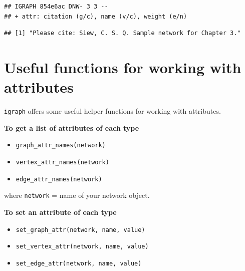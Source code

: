 \documentclass[
]{book}
\newenvironment{Shaded}{\begin{snugshade}}{\end{snugshade}}
\newcommand{\CommentTok}[1]{\textcolor[rgb]{0.56,0.35,0.01}{\textit{#1}}}
\newcommand{\FunctionTok}[1]{\textcolor[rgb]{0.13,0.29,0.53}{\textbf{#1}}}
\newcommand{\NormalTok}[1]{#1}
\newcommand{\OtherTok}[1]{\textcolor[rgb]{0.56,0.35,0.01}{#1}}
\newcommand{\SpecialCharTok}[1]{\textcolor[rgb]{0.81,0.36,0.00}{\textbf{#1}}}
\newcommand{\StringTok}[1]{\textcolor[rgb]{0.31,0.60,0.02}{#1}}
\providecommand{\tightlist}{%
  \setlength{\itemsep}{0pt}\setlength{\parskip}{0pt}}
\begin{document}
\begin{Shaded}
\end{Shaded}

\begin{verbatim}
## IGRAPH 854e6ac DNW- 3 3 -- 
## + attr: citation (g/c), name (v/c), weight (e/n)
\end{verbatim}

\begin{Shaded}
\end{Shaded}

\begin{verbatim}
## [1] "Please cite: Siew, C. S. Q. Sample network for Chapter 3."
\end{verbatim}

\section{Useful functions for working with attributes}\label{useful-functions-for-working-with-attributes}

\texttt{igraph} offers some useful helper functions for working with attributes.

\textbf{To get a list of attributes of each type}

\begin{itemize}
\tightlist
\item
  \texttt{graph\_attr\_names(network)}
\item
  \texttt{vertex\_attr\_names(network)}
\item
  \texttt{edge\_attr\_names(network)}
\end{itemize}

where \texttt{network} = name of your network object.

\textbf{To set an attribute of each type}

\begin{itemize}
\tightlist
\item
  \texttt{set\_graph\_attr(network,\ name,\ value)}
\item
  \texttt{set\_vertex\_attr(network,\ name,\ value)}
\item
  \texttt{set\_edge\_attr(network,\ name,\ value)}
\end{itemize}
\end{document}
